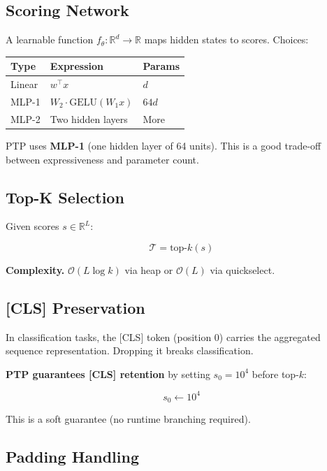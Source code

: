 \subsection{Scoring Network}

A learnable function $f_\theta: \mathbb{R}^d \to \mathbb{R}$ maps hidden 
states to scores. Choices:

\begin{table}[H]
\centering
\small
\begin{tabular}{lll}
\toprule
\textbf{Type} & \textbf{Expression} & \textbf{Params} \\
\midrule
Linear & $w^\top x$ & $d$ \\
MLP-1 & $W_2 \cdot \text{GELU}(W_1 x)$ & $64 d$ \\
MLP-2 & Two hidden layers & More \\
\bottomrule
\end{tabular}
\end{table}

PTP uses \textbf{MLP-1} (one hidden layer of 64 units). This is a good 
trade-off between expressiveness and parameter count.

\subsection{Top-K Selection}

Given scores $s \in \mathbb{R}^L$:

\[
\mathcal{T} = \text{top-}k(s)
\tag{3.4}
\]

\textbf{Complexity.} $\mathcal{O}(L \log k)$ via heap or $\mathcal{O}(L)$ via 
quickselect.

\subsection{[CLS] Preservation}

In classification tasks, the [CLS] token (position 0) carries the 
aggregated sequence representation. Dropping it breaks classification.

\textbf{PTP guarantees [CLS] retention} by setting $s_0 = 10^4$ before top-$k$:

\[
s_0 \leftarrow 10^4
\tag{3.5}
\]

This is a soft guarantee (no runtime branching required).

\subsection{Padding Handling}

